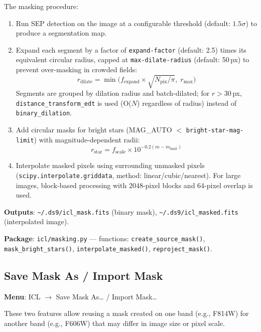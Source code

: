 \documentclass[11pt,fleqn]{book}
\begin{document}
The masking procedure:
\begin{enumerate}[leftmargin=2em]
  \item Run SEP detection on the image at a configurable threshold (default: $1.5\sigma$) to produce a segmentation map.
  \item Expand each segment by a factor of \texttt{expand-factor} (default: 2.5) times its equivalent circular radius, capped at \texttt{max-dilate-radius} (default: 50\,px) to prevent over-masking in crowded fields:
  \begin{equation}
    r_\mathrm{dilate} = \min\!\bigl(f_\mathrm{expand} \times \sqrt{N_\mathrm{pix}/\pi},\; r_\mathrm{max}\bigr)
  \end{equation}
  Segments are grouped by dilation radius and batch-dilated; for $r > 30$\,px, \texttt{distance\_transform\_edt} is used (O($N$) regardless of radius) instead of \texttt{binary\_dilation}.
  \item Add circular masks for bright stars (MAG\_AUTO $<$ \texttt{bright-star-mag-limit}) with magnitude-dependent radii:
  \begin{equation}
    r_\mathrm{star} = f_\mathrm{scale} \times 10^{-0.2(m - m_\mathrm{limit})}
  \end{equation}
  \item Interpolate masked pixels using surrounding unmasked pixels (\texttt{scipy.interpolate.griddata}, method: linear/cubic/nearest).  For large images, block-based processing with 2048-pixel blocks and 64-pixel overlap is used.
\end{enumerate}

\textbf{Outputs}: \texttt{\textasciitilde/.ds9/icl\_mask.fits} (binary mask), \texttt{\textasciitilde/.ds9/icl\_masked.fits} (interpolated image).

\textbf{Package}: \texttt{icl/masking.py} --- functions: \texttt{create\_source\_mask()}, \texttt{mask\_bright\_stars()}, \texttt{interpolate\_masked()}, \texttt{reproject\_mask()}.

\subsection{Save Mask As / Import Mask}
\label{sec:icl-mask-io}

\textbf{Menu}: ICL $\to$ Save Mask As\ldots{} / Import Mask\ldots

These two features allow reusing a mask created on one band (e.g., F814W) for another band (e.g., F606W) that may differ in image size or pixel scale.
\end{document}
